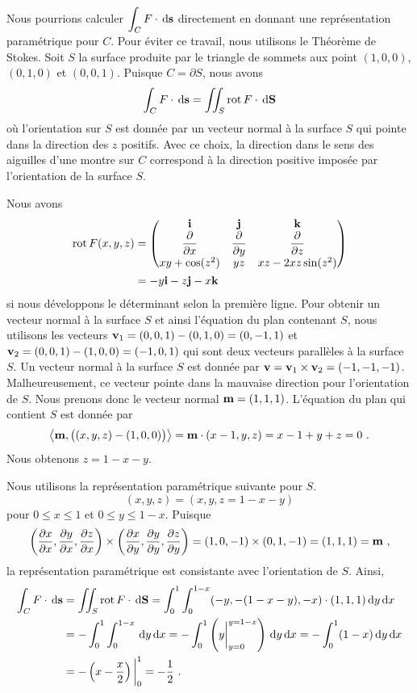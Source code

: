 {\begin{egg}
Nous pourrions calculer $\displaystyle \int_C F \cdot \,\mathrm{d}\mathbf{s}$
directement en donnant une représentation paramétrique pour $C$.  Pour
éviter ce travail, nous utilisons le Théorème de Stokes.
Soit $S$ la surface produite par le triangle de sommets aux point
$(1,0,0)$, $(0,1,0)$ et $(0,0,1)$.  Puisque $C = \partial S$, nous avons
\[
  \int_C F \cdot \,\mathrm{d}\mathbf{s} =
  \iint_S \operatorname{rot}  F \cdot \,\mathrm{d}\mathbf{S}
\]
où l'orientation sur $S$ est donnée par un vecteur normal à la surface
$S$ qui pointe dans la direction des $z$ positifs.  Avec ce choix,
la direction dans le sens des aiguilles d'une montre sur $C$
correspond à la direction positive imposée par l'orientation de  la
surface $S$.

Nous avons
\begin{align*}
\operatorname{rot} F(x,y,z) &=
\begin{pmatrix}
\mathbf{i} & \mathbf{j} & \mathbf{k} \\
\displaystyle \frac{\partial }{\partial x} & \displaystyle \frac{\partial }{\partial y}
& \displaystyle \frac{\partial }{\partial z} \\
xy +\cos(z^2) & yz & xz -2xz \sin(z^2)
\end{pmatrix} \\
&= -y \mathbf{i} - z\mathbf{j} -x \mathbf{k}
\end{align*}
si nous développons le déterminant selon la première ligne.
Pour obtenir un vecteur normal à la surface $S$ et ainsi l'équation du
plan contenant $S$, nous utilisons les vecteurs
$\mathbf{v}_1 = (0,0,1) - (0,1,0) = (0,-1,1)$ et
$\mathbf{v}_2 = (0,0,1) - (1,0,0) = (-1,0,1)$
qui sont deux vecteurs parallèles à la surface $S$.  Un vecteur normal
à la surface $S$ est donnée par
$\mathbf{v} = \mathbf{v}_1 \times \mathbf{v}_2 = (-1,-1,-1)$.
Malheureusement, ce vecteur pointe dans la mauvaise direction pour
l'orientation de $S$.  Nous prenons donc le vecteur normal
$\mathbf{m} = (1,1,1)$.  L'équation du plan qui contient $S$ est donnée
par
\[
  \left\langle{\mathbf{m}} , {\big((x,y,z) - (1,0,0)\big)}\right\rangle
= \mathbf{m} \cdot (x-1,y,z) = x-1 + y + z = 0 \ .
\]
Nous obtenons $z = 1 - x - y$.

Nous utilisons la représentation paramétrique suivante pour $S$.
\[
  (x,y,z) = (x, y, z = 1 - x- y)
\]
pour $0 \leq x \leq 1$ et $0 \leq y \leq 1-x$.  Puisque
\[
\left( \frac{\partial x}{\partial x} , \frac{\partial y}{\partial x} , \frac{\partial z}{\partial x} \right)
\times \left( \frac{\partial x}{\partial y} , \frac{\partial y}{\partial y} , \frac{\partial z}{\partial y} \right)
= ( 1, 0,-1) \times ( 0, 1, -1) = ( 1, 1, 1) = \mathbf{m} \ ,
\]
la représentation paramétrique est consistante avec l'orientation
de $S$.  Ainsi,
\begin{align*}
\int_C F \cdot \,\mathrm{d}\mathbf{s} &=
\iint_S \operatorname{rot}  F \cdot \,\mathrm{d}\mathbf{S}
= \int_0^1\int_0^{1-x} (-y,-(1-x-y),-x)\cdot ( 1,1,1) \,\mathrm{d}y\,\mathrm{d}x \\
&= - \int_0^1\int_0^{1-x} \,\mathrm{d}y\,\mathrm{d}x
= - \int_0^1 \left(y\bigg|_{y=0}^{y=1-x}\right) \,\mathrm{d}y\,\mathrm{d}x
= - \int_0^1 (1-x) \,\mathrm{d}y\,\mathrm{d}x \\
&= - \left( x - \frac{x}{2} \right) \bigg|_0^1 = - \frac{1}{2} \ .
\end{align*}
\end{egg}

}
